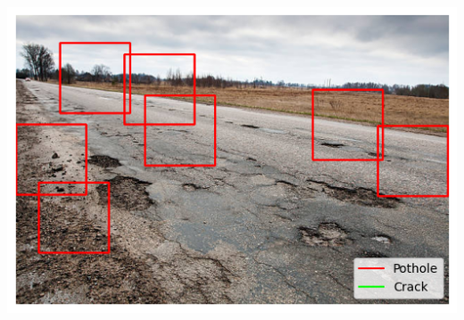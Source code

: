 \documentclass[12pt, letterpaper, twoside]{article}
\begin{document}
\includegraphics{result_4.png}
\end{document}
